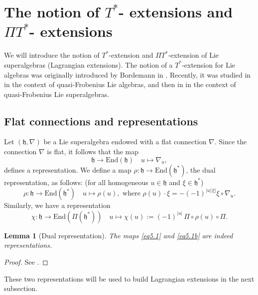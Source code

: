 \documentclass[12pt]{amsart}
\newtheorem{lemma}[Theorem]{Lemma}
\newcommand{\fh}{\mathfrak{h}}
\begin{document}
\section {The notion of \texorpdfstring{$T^*$-}{T*-} extensions and \texorpdfstring{$\Pi T^*$-}{Pi T*-} extensions} We will introduce the notion of $T^*$-extension and $\Pi T^*$-extension of Lie superalgebras (Lagrangian extensions). The notion of a $T^*$-extension for Lie algebras was originally introduced by Bordemann in \cite{Bor}.  Recently, it was studied in \cite{BC} in the context of quasi-Frobenius Lie algebras, and then in \cite{BBE, BM} in the context of quasi-Frobenius Lie superalgebras. 
\subsection{Flat connections and representations}
Let $({\mathfrak h}, \nabla)$ be a Lie superalgebra endowed with a flat connection $\nabla$. Since the connection $\nabla$ is flat, it follows that the map 
\[
\mathfrak{h} \rightarrow \mathrm{End}(\mathfrak{h}) \quad u\mapsto \nabla_u,
\]
defines a representation. We define a map $\rho: \mathfrak{h} \rightarrow \mathrm{End}(\mathfrak{h}^*)$, the dual representation, as follows: (for all homogeneous $u\in \mathfrak{h}$ and $\xi\in \mathfrak{h}^*$)
\begin{equation}\label{eq5.1}
\rho: \fh \rightarrow \mathrm{End}(\mathfrak{h}^*) \quad u \mapsto \rho(u), \text{ where } \rho(u)\cdot \xi =- (-1)^{|u| |\xi|} \xi \circ \nabla_u.
\end{equation} 
Similarly, we have a representation 
\begin{equation}\label{eq5.1b}
\chi: \fh \rightarrow \mathrm{End}(\Pi(\mathfrak{h}^*)) \quad u\mapsto \chi(u):= (-1)^{|u|}\, \Pi \circ \rho(u)\circ \Pi.
\end{equation} 

\begin{lemma}[Dual representation]
The maps \eqref{eq5.1} and \eqref{eq5.1b} are indeed representations. 

\end{lemma}
\begin{proof}
See \cite{BM}. 
\end{proof}
These two representations will be used to build Lagrangian extensions in the next subsection. 
\end{document}
